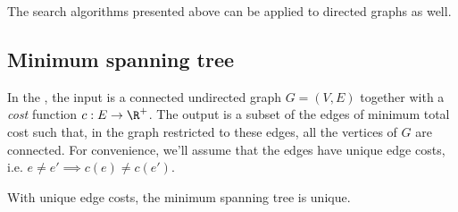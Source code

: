 \begin{note} \label{note:Search-algorithms-on-directed-graphs}
The search algorithms presented above can be applied to directed graphs as well.
\end{note}






\subsection{Minimum spanning tree}


\begin{definition} \label{definition:Minimum-spanning-tree-MST-problem} 
In the , the input is a connected undirected graph $G = (V,E)$ together with a \emph{cost} function $c : E \to \R^+$. The output is a subset of the edges of minimum total cost such that, in the graph restricted to these edges, all the vertices of $G$ are connected. For convenience, we'll assume that the edges have unique edge costs, i.e. $e \neq e' \implies c(e) \neq c(e')$.
\end{definition}


\begin{note} \label{note:Unique-edges-costs-imply-unique-MST}
With unique edge costs, the minimum spanning tree is unique.
\end{note}


